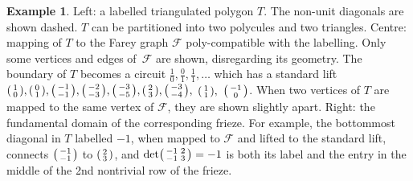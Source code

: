 \documentclass[12pt]{article}
\theoremstyle{definition}
\newtheorem{example}{Example}
\newcommand{\F}{\mathscr{F}}
\begin{document}
\begin{example}
Left: a labelled triangulated polygon $T$. The non-unit diagonals are shown dashed. $T$ can be partitioned into two polycules and two triangles. Centre: mapping of $T$ to the Farey graph $\F$ poly-compatible with the labelling. Only some vertices and edges of~$\F$ are shown, disregarding its geometry. The boundary of $T$ becomes a circuit $\tfrac10,\tfrac01,\tfrac11,\dots$ which has a standard lift $\begin{psmallmatrix}1\\0\end{psmallmatrix},  \begin{psmallmatrix}0\\1\end{psmallmatrix}, \begin{psmallmatrix}-1\\-1\end{psmallmatrix}, \begin{psmallmatrix}-2\\-3\end{psmallmatrix}, \begin{psmallmatrix}-3\\-5\end{psmallmatrix}, \begin{psmallmatrix}2\\3\end{psmallmatrix}, \begin{psmallmatrix}-3\\-4\end{psmallmatrix},$ $\begin{psmallmatrix}1\\1\end{psmallmatrix},$ $\begin{psmallmatrix}-1\\0\end{psmallmatrix}$. When two vertices of $T$ are mapped to the same vertex of $\F$, they are shown slightly apart. Right: the fundamental domain of the corresponding frieze. For example, the bottommost diagonal in $T$ labelled $-1$, when mapped to $\F$ and lifted to the standard lift, connects $\begin{psmallmatrix}-1\\-1\end{psmallmatrix}$ to $\begin{psmallmatrix}2\\3\end{psmallmatrix}$, and $\det\begin{psmallmatrix}-1&2\\-1&3\end{psmallmatrix}=-1$ is both its label and the entry in the middle of the 2nd nontrivial row of the frieze.


\end{example}
\end{document}
